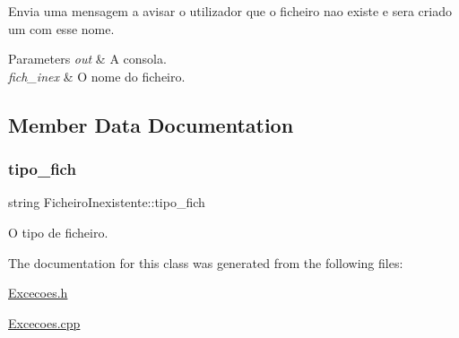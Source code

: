 Envia uma mensagem a avisar o utilizador que o ficheiro nao existe e sera criado um com esse nome. 


\begin{DoxyParams}{Parameters}
{\em out} & A consola. \\
\hline
{\em fich\+\_\+inex} & O nome do ficheiro. \\
\hline
\end{DoxyParams}


\subsection{Member Data Documentation}
\hypertarget{class_ficheiro_inexistente_ac848deed05e95fdd183bba69cc646577}{}\label{class_ficheiro_inexistente_ac848deed05e95fdd183bba69cc646577} 
\subsubsection{\texorpdfstring{tipo\+\_\+fich}{tipo\_fich}}
{\footnotesize\ttfamily string Ficheiro\+Inexistente\+::tipo\+\_\+fich}



O tipo de ficheiro. 



The documentation for this class was generated from the following files\+:\begin{DoxyCompactItemize}
\item 
\hyperlink{_excecoes_8h}{Excecoes.\+h}\item 
\hyperlink{_excecoes_8cpp}{Excecoes.\+cpp}\end{DoxyCompactItemize}
